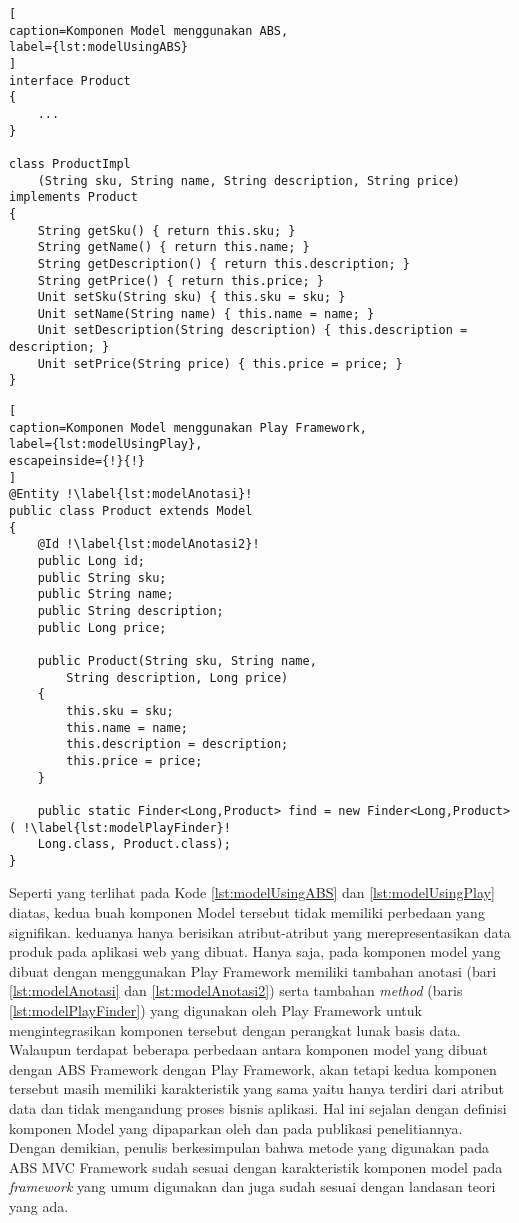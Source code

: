 \begin{lstlisting}[
caption=Komponen Model menggunakan ABS,
label={lst:modelUsingABS}
]
interface Product
{
    ...
}

class ProductImpl 
	(String sku, String name, String description, String price) implements Product
{
	String getSku() { return this.sku; }
	String getName() { return this.name; }
	String getDescription() { return this.description; }
	String getPrice() { return this.price; }
	Unit setSku(String sku) { this.sku = sku; }
	Unit setName(String name) { this.name = name; }
	Unit setDescription(String description) { this.description = description; }
	Unit setPrice(String price) { this.price = price; }
}
\end{lstlisting}

\begin{lstlisting}[
caption=Komponen Model menggunakan Play Framework,
label={lst:modelUsingPlay},
escapeinside={!}{!}
]
@Entity !\label{lst:modelAnotasi}!
public class Product extends Model
{
	@Id !\label{lst:modelAnotasi2}!
	public Long id;
	public String sku;
	public String name;
	public String description;
	public Long price;

	public Product(String sku, String name,
		String description, Long price)
	{
		this.sku = sku;
		this.name = name;
		this.description = description;
		this.price = price;
	}

	public static Finder<Long,Product> find = new Finder<Long,Product>( !\label{lst:modelPlayFinder}!
    Long.class, Product.class); 
}
\end{lstlisting}

Seperti yang terlihat pada Kode \ref{lst:modelUsingABS} dan \ref{lst:modelUsingPlay} diatas, kedua buah komponen Model tersebut tidak memiliki perbedaan yang signifikan. keduanya hanya berisikan atribut-atribut yang merepresentasikan data produk pada aplikasi web yang dibuat. Hanya saja, pada komponen model yang dibuat dengan menggunakan Play Framework memiliki tambahan anotasi (bari \ref{lst:modelAnotasi} dan \ref{lst:modelAnotasi2}) serta tambahan \textit{method} (baris \ref{lst:modelPlayFinder}) yang digunakan oleh Play Framework untuk mengintegrasikan komponen tersebut dengan perangkat lunak basis data.\\

Walaupun terdapat beberapa perbedaan antara komponen model yang dibuat dengan ABS Framework dengan Play Framework, akan tetapi kedua komponen tersebut masih memiliki karakteristik yang sama yaitu hanya terdiri dari atribut data dan tidak mengandung proses bisnis aplikasi. Hal ini sejalan dengan definisi komponen Model yang dipaparkan oleh \cite{krasner1988desc} dan \cite{leff2001web} pada publikasi penelitiannya. Dengan demikian, penulis berkesimpulan bahwa metode yang digunakan pada ABS MVC Framework sudah sesuai dengan karakteristik komponen model pada \textit{framework} yang umum digunakan dan juga sudah sesuai dengan landasan teori yang ada.

